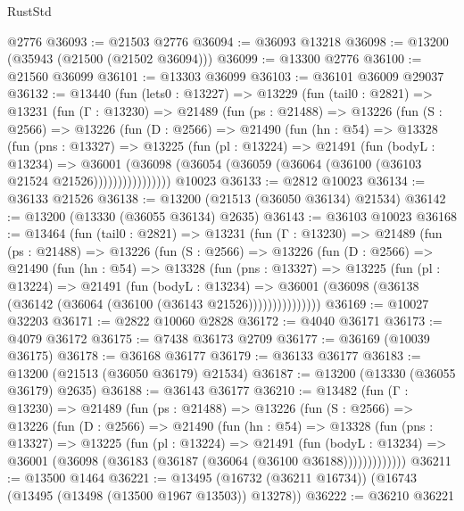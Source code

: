 \begin{lexlean}{RustStd}
\begin{coremodule}
    @2776
@36093 := @21503 @2776
@36094 := @36093 @13218
@36098 := @13200 (@35943 (@21500 (@21502 @36094)))
@36099 := @13300 @2776
@36100 := @21560 @36099
@36101 := @13303 @36099
@36103 := @36101 @36009 @29037
@36132 := @13440
    (fun (lets0 : @13227) =>
    @13229
      (fun (tail0 : @2821) =>
      @13231
        (fun (Γ : @13230) =>
        @21489
          (fun (ps : @21488) =>
          @13226
            (fun (S : @2566) =>
            @13226
              (fun (D : @2566) =>
              @21490
                (fun (hn : @54) =>
                @13328
                  (fun (pns : @13327) =>
                  @13225
                    (fun (pl : @13224) =>
                    @21491
                      (fun (bodyL : @13234) =>
                      @36001
                        (@36098
                          (@36054 (@36059 (@36064 (@36100 (@36103 @21524 @21526))))))))))))))))
    @10023
@36133 := @2812 @10023
@36134 := @36133 @21526
@36138 := @13200 (@21513 (@36050 @36134) @21534)
@36142 := @13200 (@13330 (@36055 @36134) @2635)
@36143 := @36103 @10023
@36168 := @13464
    (fun (tail0 : @2821) =>
    @13231
      (fun (Γ : @13230) =>
      @21489
        (fun (ps : @21488) =>
        @13226
          (fun (S : @2566) =>
          @13226
            (fun (D : @2566) =>
            @21490
              (fun (hn : @54) =>
              @13328
                (fun (pns : @13327) =>
                @13225
                  (fun (pl : @13224) =>
                  @21491
                    (fun (bodyL : @13234) =>
                    @36001 (@36098 (@36138 (@36142 (@36064 (@36100 (@36143 @21526)))))))))))))))
@36169 := @10027 @32203
@36171 := @2822 @10060 @2828
@36172 := @4040 @36171
@36173 := @4079 @36172
@36175 := @7438 @36173 @2709
@36177 := @36169 (@10039 @36175)
@36178 := @36168 @36177
@36179 := @36133 @36177
@36183 := @13200 (@21513 (@36050 @36179) @21534)
@36187 := @13200 (@13330 (@36055 @36179) @2635)
@36188 := @36143 @36177
@36210 := @13482
    (fun (Γ : @13230) =>
    @21489
      (fun (ps : @21488) =>
      @13226
        (fun (S : @2566) =>
        @13226
          (fun (D : @2566) =>
          @21490
            (fun (hn : @54) =>
            @13328
              (fun (pns : @13327) =>
              @13225
                (fun (pl : @13224) =>
                @21491
                  (fun (bodyL : @13234) =>
                  @36001 (@36098 (@36183 (@36187 (@36064 (@36100 @36188)))))))))))))
@36211 := @13500 @1464
@36221 := @13495 (@16732 (@36211 @16734)) (@16743 (@13495 (@13498 (@13500 @1967 @13503)) @13278))
@36222 := @36210 @36221

\end{coremodule}
\end{lexlean}
